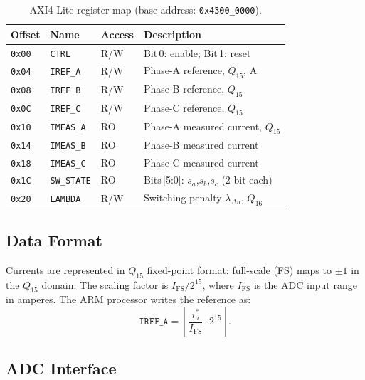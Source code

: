 \documentclass[11pt,a4paper]{article}
\begin{document}
\begin{table}[htbp]
  \centering
  \caption{AXI4-Lite register map (base address: \texttt{0x4300\_0000}).}
  \label{tab:regmap}
  \begin{tabular}{llll}
    \toprule
    Offset & Name & Access & Description \\
    \midrule
    \texttt{0x00} & \texttt{CTRL}       & R/W & Bit\,0: enable; Bit\,1: reset \\
    \texttt{0x04} & \texttt{IREF\_A}    & R/W & Phase-A reference, $Q_{15}$, \si{\ampere} \\
    \texttt{0x08} & \texttt{IREF\_B}    & R/W & Phase-B reference, $Q_{15}$ \\
    \texttt{0x0C} & \texttt{IREF\_C}    & R/W & Phase-C reference, $Q_{15}$ \\
    \texttt{0x10} & \texttt{IMEAS\_A}   & RO  & Phase-A measured current, $Q_{15}$ \\
    \texttt{0x14} & \texttt{IMEAS\_B}   & RO  & Phase-B measured current \\
    \texttt{0x18} & \texttt{IMEAS\_C}   & RO  & Phase-C measured current \\
    \texttt{0x1C} & \texttt{SW\_STATE}  & RO  & Bits\,[5:0]: $s_a$,$s_b$,$s_c$ (2-bit each) \\
    \texttt{0x20} & \texttt{LAMBDA}     & R/W & Switching penalty $\lambda_{\Delta u}$, $Q_{16}$ \\
    \bottomrule
  \end{tabular}
\end{table}

\subsection{Data Format}
\label{sec:dataformat}

Currents are represented in $Q_{15}$ fixed-point format: full-scale
(FS) maps to $\pm 1$ in the $Q_{15}$ domain.  The scaling factor is
$I_{\mathrm{FS}} / 2^{15}$, where $I_{\mathrm{FS}}$ is the ADC input
range in amperes.  The ARM processor writes the reference as:
\begin{equation}
  \texttt{IREF\_A} = \left\lfloor \frac{i_a^*}{I_{\mathrm{FS}}} \cdot 2^{15} \right\rceil.
\end{equation}

\subsection{ADC Interface}
\label{sec:adc}
\end{document}
